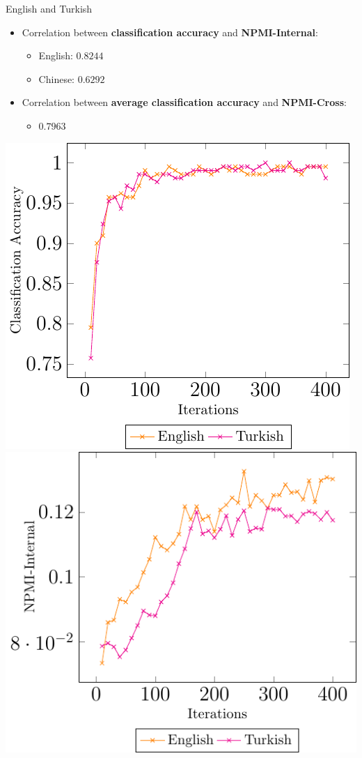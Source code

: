 \documentclass[compress]{beamer}
\begin{document}
	\begin{frame}{English and Turkish}
		\begin{itemize}
			\item Correlation between \textbf{classification accuracy} and \textbf{NPMI-Internal}:
			\begin{itemize}
				\item English: $0.8244$
				\item Chinese: $0.6292$
			\end{itemize}
			\item Correlation between \textbf{average classification accuracy} and \textbf{NPMI-Cross}:
			\begin{itemize}
				\item $0.7963$
			\end{itemize}
		\end{itemize}
		\begin{center}
			\includegraphics[height=0.5\textheight]{multilingual_itm/clf-en-tr.pdf}
			\includegraphics[height=0.5\textheight]{multilingual_itm/npmi-en-tr.pdf}
		\end{center}
	\end{frame}
\end{document}
